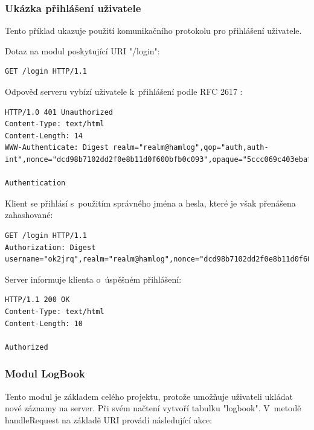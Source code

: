 \subsubsection{Ukázka přihlášení uživatele}

Tento příklad ukazuje použití komunikačního protokolu pro přihlášení uživatele.

Dotaz na modul poskytující URI "/login":
\begin{verbatim}
GET /login HTTP/1.1

\end{verbatim}

Odpověď serveru vybízí uživatele k~přihlášení podle RFC 2617 \cite{rfc2617}:
\begin{verbatim}
HTTP/1.0 401 Unauthorized
Content-Type: text/html
Content-Length: 14
WWW-Authenticate: Digest realm="realm@hamlog",qop="auth,auth-int",nonce="dcd98b7102dd2f0e8b11d0f600bfb0c093",opaque="5ccc069c403ebaf9f0171e9517f40e41"

Authentication
\end{verbatim}

Klient se přihlásí s~použitím správného jména a hesla, které je však přenášena
zahashované:
\begin{verbatim}
GET /login HTTP/1.1
Authorization: Digest username="ok2jrq",realm="realm@hamlog",nonce="dcd98b7102dd2f0e8b11d0f600bfb0c093",uri="/login",qop=auth,response="d197141dc972c02d71e6a73b3396ed53",opaque="5ccc069c403ebaf9f0171e9517f40e41")

\end{verbatim}

Server informuje klienta o~úspěšném přihlášení:
\begin{verbatim}
HTTP/1.1 200 OK
Content-Type: text/html
Content-Length: 10

Authorized
\end{verbatim}

\subsubsection{Modul LogBook}

Tento modul je základem celého projektu, protože umožňuje uživateli ukládat nové záznamy na server. Při svém načtení
vytvoří tabulku "logbook". V~metodě handleRequest na základě URI provádí následující akce:

